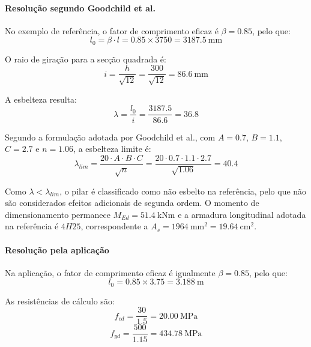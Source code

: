 \paragraph{Resolução segundo Goodchild et al.}

No exemplo de referência, o fator de comprimento eficaz é \(\beta = 0.85\), pelo que:
\begin{equation}
l_0 = \beta \cdot l = 0.85 \times 3750 = 3187.5\ \text{mm}
\end{equation}

O raio de giração para a secção quadrada é:
\begin{equation}
i = \frac{h}{\sqrt{12}} = \frac{300}{\sqrt{12}} = 86.6\ \text{mm}
\end{equation}

A esbelteza resulta:
\begin{equation}
\lambda = \frac{l_0}{i} = \frac{3187.5}{86.6} = 36.8
\end{equation}

Segundo a formulação adotada por Goodchild et al., com \(A=0.7\), \(B=1.1\), \(C=2.7\) e \(n=1.06\), a esbelteza limite é:
\begin{equation}
\lambda_{lim}= \frac{20 \cdot A \cdot B \cdot C}{\sqrt{n}} = \frac{20 \cdot 0.7 \cdot 1.1 \cdot 2.7}{\sqrt{1.06}} = 40.4
\end{equation}

Como \(\lambda < \lambda_{lim}\), o pilar é classificado como não esbelto na referência, pelo que não são considerados efeitos adicionais de segunda ordem. O momento de dimensionamento permanece \(M_{Ed} = 51.4\ \text{kNm}\) e a armadura longitudinal adotada na referência é \(4H25\), correspondente a \(A_{s} = 1964\ \text{mm}^2 = 19.64\ \text{cm}^2\).

\paragraph{Resolução pela aplicação}

Na aplicação, o fator de comprimento eficaz é igualmente \(\beta=0.85\), pelo que:
\begin{equation}
l_0 = 0.85 \times 3.75 = 3.188\ \text{m}
\end{equation}

As resistências de cálculo são:
\begin{equation}
f_{cd} = \frac{30}{1.5} = 20.00\ \text{MPa}
\end{equation}
\begin{equation}
f_{yd} = \frac{500}{1.15} = 434.78\ \text{MPa}
\end{equation}

